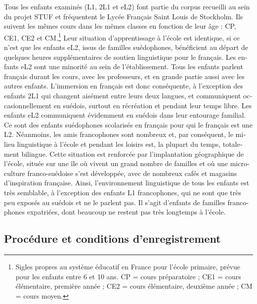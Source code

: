 \documentclass[french, output=paper]{langscibook}
\begin{document}
\begin{otherlanguage}{french}
Tous les enfants examinés (L1, 2L1 et eL2) font partie du corpus recueilli au sein du projet STUF et fréquentent le Lycée Français Saint Louis de Stockholm. Ils suivent les mêmes cours dans les mêmes classes en fonction de leur âge : CP, CE1, CE2 et CM.\footnote{Sigles propres au système éducatif en France pour l'école primaire, prévue pour les enfants entre 6 et 10 ans. CP = cours préparatoire ; CE1 = cours élémentaire, première année ; CE2 = cours élémentaire, deuxième année ; CM = cours moyen.} Leur situation d’apprentissage à l’école est identique, si ce n’est que les enfants eL2, issus de familles suédophones, bénéficient au départ de quelques heures supplémentaires de soutien linguistique pour le français. Les enfants eL2 sont une minorité au sein de l’établissement. Tous les enfants parlent français durant les cours, avec les professeurs, et en grande partie aussi avec les autres enfants. L’immersion en français est donc conséquente, à l’exception des enfants 2L1 qui changent aisément entre leurs deux langues, et communiquent occasionnellement en suédois, surtout en récréation et pendant leur temps libre. Les enfants eL2 communiquent évidemment en suédois dans leur entourage familial. Ce sont des enfants suédophones scolarisés en français pour qui le français est une L2. Néanmoins, les amis francophones sont nombreux et, par conséquent, le milieu linguistique à l’école et pendant les loisirs est, la plupart du temps, totalement bilingue. Cette situation est renforcée par l’implantation géographique de l’école, située sur une île où vivent un grand nombre de familles et où une micro-culture franco-suédoise s’est développée, avec de nombreux cafés et magasins d’inspiration française. Ainsi, l’environnement linguistique de tous les enfants est très semblable, à l’exception des enfants L1 francophones, qui ne sont que très peu exposés au suédois et ne le parlent pas. Il s’agit d’enfants de familles francophones expatriées, dont beaucoup ne restent pas très longtemps à l’école.  


\subsection{Procédure et conditions d’enregistrement}\label{sec:kihlstedt:4.2}


\end{otherlanguage}
\end{document}

